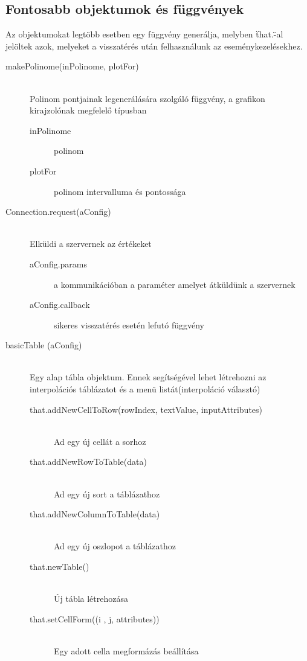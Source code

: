 \subsection{Fontosabb objektumok és függvények}
	\hfill
	Az objektumokat legtöbb esetben egy függvény generálja, melyben \"that.\"-al jelöltek azok, melyeket a visszatérés után felhasználunk az eseménykezelésekhez.
	\begin{description}
		\item[makePolinome(inPolinome, plotFor)] \hfill \\ 
			Polinom pontjainak legenerálására szolgáló függvény, a grafikon kirajzolónak megfelelő típusban
			\begin{description}
				\item[inPolinome] polinom
				\item[plotFor] polinom intervalluma és pontossága
			\end{description}
		\item[Connection.request(aConfig)] \hfill \\ 
			Elküldi a szervernek az értékeket
			\begin{description}
				\item[aConfig.params] a kommunikációban a paraméter amelyet átküldünk a szervernek
				\item[aConfig.callback] sikeres visszatérés esetén lefutó függvény
			\end{description}
		\item[basicTable (aConfig)]
			\hfill \\ 
			Egy alap tábla objektum. Ennek segítségével lehet létrehozni az interpolációs táblázatot és a menü listát(interpoláció választó)
			\begin{description}
			\item[that.addNewCellToRow(rowIndex, textValue, inputAttributes)] 
				\hfill \\  Ad egy új cellát a sorhoz
			\item[that.addNewRowToTable(data)]
				\hfill \\ Ad egy új sort a táblázathoz
			\item[that.addNewColumnToTable(data)]
				\hfill \\ Ad egy új oszlopot a táblázathoz
			\item[that.newTable()] 
				\hfill \\ Új tábla létrehozása
			\item[that.setCellForm((i , j, attributes))] 
				\hfill \\ Egy adott cella megformázás beállítása

\end{description}
\end{description}
